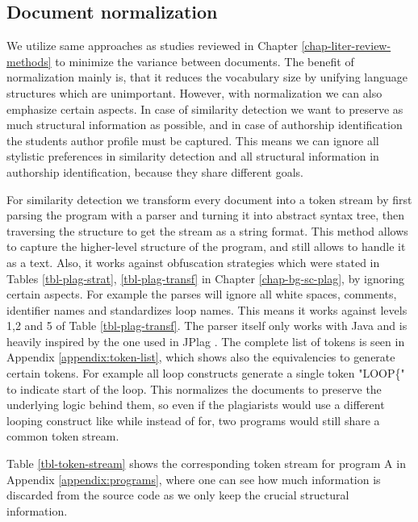 \subsection{Document normalization}

We utilize same approaches as studies reviewed in Chapter \ref{chap-liter-review-methods} to minimize the variance between documents. The benefit of normalization mainly is, that it reduces the vocabulary size by unifying language structures which are unimportant. However, with normalization we can also emphasize certain aspects. In case of similarity detection we want to preserve as much structural information as possible, and in case of authorship identification the students author profile must be captured. This means we can ignore all stylistic preferences in similarity detection and all structural information in authorship identification, because they share different goals.

For similarity detection we transform every document into a token stream by first parsing the program with a parser and turning it into abstract syntax tree, then traversing the structure to get the stream as a string format. This method allows to capture the higher-level structure of the program, and still allows to handle it as a text. Also, it works against obfuscation strategies which were stated in Tables \ref{tbl-plag-strat}, \ref{tbl-plag-transf} in Chapter \ref{chap-bg-sc-plag}, by ignoring certain aspects. For example the parses will ignore all white spaces, comments, identifier names and standardizes loop names. This means it works against levels 1,2 and 5 of Table \ref{tbl-plag-transf}. The parser itself only works with Java and is heavily inspired by the one used in JPlag \cite{prechelt2002finding}. The complete list of tokens is seen in Appendix \ref{appendix:token-list}, which shows also the equivalencies to generate certain tokens. For example all loop constructs generate a single token "LOOP\{" to indicate start of the loop. This normalizes the documents to preserve the underlying logic behind them, so even if the plagiarists would use a different looping construct like while instead of for, two programs would still share a common token stream. 

Table \ref{tbl-token-stream} shows the corresponding token stream for program A in Appendix \ref{appendix:programs}, where one can see how much information is discarded from the source code as we only keep the crucial structural information.

